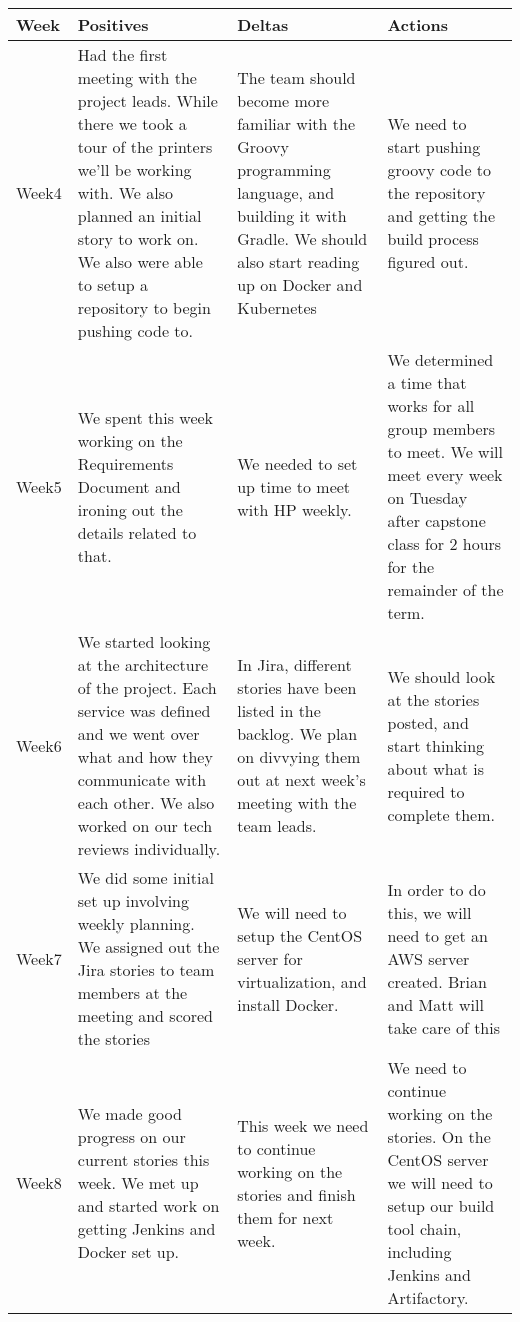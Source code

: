 \documentclass[onecolumn, draftclsnofoot,10pt, compsoc]{IEEEtran}
\begin{document}
\begin{center}
\begin{longtable}{ | m{4em} | m{12em}| m{12em} | m{12em} | } 
\hline
Week&
Positives&
Deltas&
Actions
\\ \hline

Week4&
Had the first meeting with the project leads.  While there we took a tour of the printers we'll be working with.  We also planned an initial story to work on. We also were able to setup a repository to begin pushing code to.&
The team should become more familiar with the Groovy programming language, and building it with Gradle.  We should also start reading up on Docker and Kubernetes&
We need to start pushing groovy code to the repository and getting the build process figured out.

\\ 
\hline
Week5&
We spent this week working on the Requirements Document and ironing out the details related to that. 
&We needed to set up time to meet with HP weekly.
&We determined a time that works for all group members to meet. We will meet every week on Tuesday after capstone class for 2 hours for the remainder of the term.

\\ 
\hline
Week6&
We started looking at the architecture of the project.  
Each service was defined and we went over what and how they communicate with each other.
We also worked on our tech reviews individually.&
In Jira, different stories have been listed in the backlog.  We plan on divvying them out at next week's meeting with the team leads.&
We should look at the stories posted, and start thinking about what is required to complete them.  

\\ 
\hline
Week7&
We did some initial set up involving weekly planning. We assigned out the Jira stories to team members at the meeting and scored the stories&
We will need to setup the CentOS server for virtualization, and install Docker.&
In order to do this, we will need to get an AWS server created. Brian and Matt will take care of this



\\ 
\hline
Week8&
We made good progress on our current stories this week. We met up and started work on getting Jenkins and Docker set up.
&This week we need to continue working on the stories and finish them for next week.
&
We need to continue working on the stories. On the CentOS server we will need to setup our build tool chain, including Jenkins and Artifactory.


\end{longtable}
\end{center}
\end{document}
